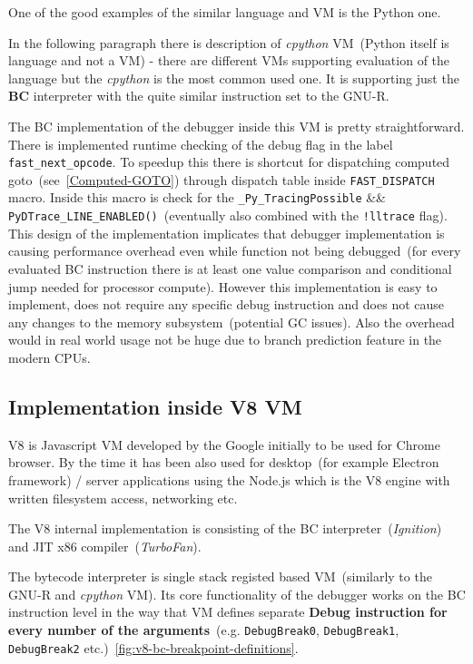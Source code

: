 \documentclass[thesis=M,english]{FITthesis}[2018/10/20]
\newcommand{\code}[1]{\texttt{#1}}
\begin{document}
One of the good examples of the similar language and VM is the Python one.

In the following paragraph there is description of \textit{cpython} VM~(Python itself is language and not a VM) - there are different VMs supporting evaluation of the language but the \textit{cpython} is the most common used one. It is supporting just the \textbf{BC} interpreter with the quite similar instruction set to the GNU-R.

The BC implementation of the debugger inside this VM is pretty straightforward. There is implemented runtime checking of the debug flag in the label \code{fast{\_}next{\_}opcode}. To speedup this there is shortcut for dispatching computed goto~(see~\ref{Computed-GOTO}) through dispatch table inside \code{FAST{\_}DISPATCH} macro. Inside this macro is check for the \code{{\!}{\_}Py{\_}TracingPossible} {\&\&} \code{{\!}PyDTrace{\_}LINE{\_}ENABLED()}~(eventually also combined with the \code{!lltrace} flag). This design of the implementation implicates that debugger implementation is causing performance overhead even while function not being debugged~(for every evaluated BC instruction there is at least one value comparison and conditional jump needed for processor compute). However this implementation is easy to implement, does not require any specific debug instruction and does not cause any changes to the memory subsystem~(potential GC issues). Also the overhead would in real world usage not be huge due to branch prediction feature in the modern CPUs.

\subsection{Implementation inside V8 VM}\label{bcdebug-implementation-in-v8}

V8 is Javascript VM developed by the Google initially to be used for Chrome browser. By the time it has been also used for desktop~(for example Electron framework) / server applications using the Node.js which is the V8 engine with written filesystem access, networking etc.

The V8 internal implementation is consisting of the BC interpreter~(\textit{Ignition}) and JIT x86 compiler~(\textit{TurboFan}).

The bytecode interpreter is single stack registed based VM~(similarly to the GNU-R and \textit{cpython} VM). Its core functionality of the debugger works on the BC instruction level in the way that VM defines separate \textbf{Debug instruction for every number of the arguments}~(e.g. \code{DebugBreak0}, \code{DebugBreak1}, \code{DebugBreak2} etc.)~\ref{fig:v8-bc-breakpoint-definitions}.
\end{document}
